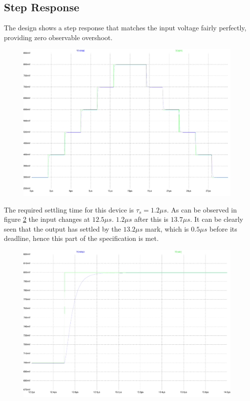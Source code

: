 \subsection{Step Response}

The design shows a step response that matches the input voltage fairly perfectly, providing zero observable overshoot.
\begin{figure}[H]
	\centering
	\includegraphics[width=\textwidth]{./images/StepResponse-both.pdf}
	\caption{}
	\label{fig:step}
\end{figure}

The required settling time for this device is $\tau_{s} = 1.2\mu s$.
As can be observed in figure \ref{fig:ztep} the input changes at $12.5\mu s$.
$1.2\mu s$ after this is $13.7\mu s$.
It can be clearly seen that the output has settled by the $13.2\mu s$ mark, which is $0.5\mu s$ before its deadline, hence this part of the specification is met.

\begin{figure}[H]
	\centering
	\includegraphics[width=\textwidth]{./images/StepResponse-zoom.pdf}
	\caption{}
	\label{fig:ztep}
\end{figure}
